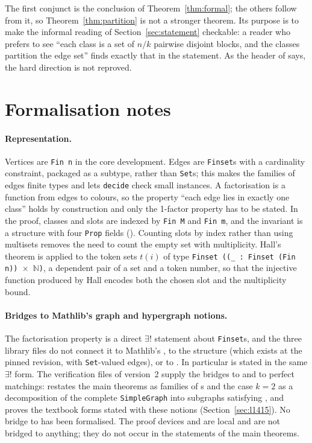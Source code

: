 \documentclass[11pt]{article}
\theoremstyle{definition}
\theoremstyle{remark}
\newcommand{\lean}[1]{\texttt{#1}}
\begin{document}
The first conjunct is the conclusion of Theorem~\ref{thm:formal}; the others follow from it, so
Theorem~\ref{thm:partition} is not a stronger theorem. Its purpose is to make the informal reading
of Section~\ref{sec:statement} checkable: a reader who prefers to see ``each class is a set of
$n/k$ pairwise disjoint blocks, and the classes partition the edge set'' finds exactly that in
the statement. As the header of  says, the hard direction is not reproved.

\section{Formalisation notes}\label{sec:notes}

\paragraph{Representation.} Vertices are \lean{Fin n} in the core development. Edges are
\lean{Finset}s with a cardinality constraint, packaged as a subtype, rather than \lean{Set}s; this
makes the families of edges finite types and lets \lean{decide} check small instances. A
factorisation is a function from edges to colours, so the property ``each edge lies in exactly
one class'' holds by construction and only the 1-factor property has to be stated. In the proof,
classes and slots are indexed by \lean{Fin M} and \lean{Fin m}, and the invariant is a structure
with four \lean{Prop} fields (). Counting slots by index rather than using
multisets removes the need to count the empty set with multiplicity. Hall's theorem is applied to
the token sets $t(i)$ of type \lean{Finset ((\_ : Finset (Fin n)) }$\times$\lean{ }$\mathbb{N}$\lean{)}, a dependent pair of a set
and a token number, so that the injective function produced by Hall encodes both the chosen slot
and the multiplicity bound.

\paragraph{Bridges to Mathlib's graph and hypergraph notions.} The factorisation property is a
direct $\exists!$ statement about \lean{Finset}s, and the three library files do not connect it to
Mathlib's , to the structure  (which
exists at the pinned revision, with \lean{Set}-valued edges), or to . In
particular  is stated in the same $\exists!$ form. The
verification files of version~2 supply the bridges to  and to perfect matchings:
 restates the main theorems as families of s and the case $k=2$ as
a decomposition of the complete \lean{SimpleGraph} into subgraphs satisfying
, and  proves the textbook forms
stated with these notions (Section~\ref{sec:l1415}). No bridge to  has been
formalised. The proof devices  and
 are local and are not bridged to anything; they do not occur in the statements
of the main theorems.
\end{document}
